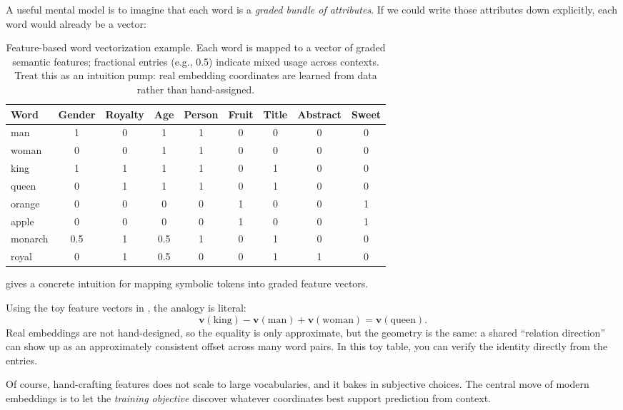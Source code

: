 A useful mental model is to imagine that each word is a \emph{graded bundle of attributes}. If we could write those attributes down explicitly, each word would already be a vector:

\begin{table}[t]
\centering
\small
\caption{Feature-based word vectorization example. Each word is mapped to a vector of graded semantic features; fractional entries (e.g., 0.5) indicate mixed usage across contexts. Treat this as an intuition pump: real embedding coordinates are learned from data rather than hand-assigned.}
\label{tab:word_feature_vectorization}
\begin{tabular}{l|cccccccc}
\textbf{Word} & Gender & Royalty & Age & Person & Fruit & Title & Abstract & Sweet \\
\hline
man & 1 & 0 & 1 & 1 & 0 & 0 & 0 & 0 \\
woman & 0 & 0 & 1 & 1 & 0 & 0 & 0 & 0 \\
king & 1 & 1 & 1 & 1 & 0 & 1 & 0 & 0 \\
queen & 0 & 1 & 1 & 1 & 0 & 1 & 0 & 0 \\
orange & 0 & 0 & 0 & 0 & 1 & 0 & 0 & 1 \\
apple & 0 & 0 & 0 & 0 & 1 & 0 & 0 & 1 \\
monarch & 0.5 & 1 & 0.5 & 1 & 0 & 1 & 0 & 0 \\
royal & 0 & 1 & 0.5 & 0 & 0 & 1 & 1 & 0 \\
\end{tabular}
\end{table}

 gives a concrete intuition for mapping symbolic tokens into graded feature vectors.

\begin{tcolorbox}[summarybox, title={Numeric check: why the analogy arithmetic can work}]
Using the toy feature vectors in , the analogy is literal:
\[
\mathbf{v}(\text{king})-\mathbf{v}(\text{man})+\mathbf{v}(\text{woman})=\mathbf{v}(\text{queen}).
\]
Real embeddings are not hand-designed, so the equality is only approximate, but the geometry is the same: a shared ``relation direction'' can show up as an approximately consistent offset across many word pairs. In this toy table, you can verify the identity directly from the entries.
\end{tcolorbox}

Of course, hand-crafting features does not scale to large vocabularies, and it bakes in subjective choices. The central move of modern embeddings is to let the \emph{training objective} discover whatever coordinates best support prediction from context.

